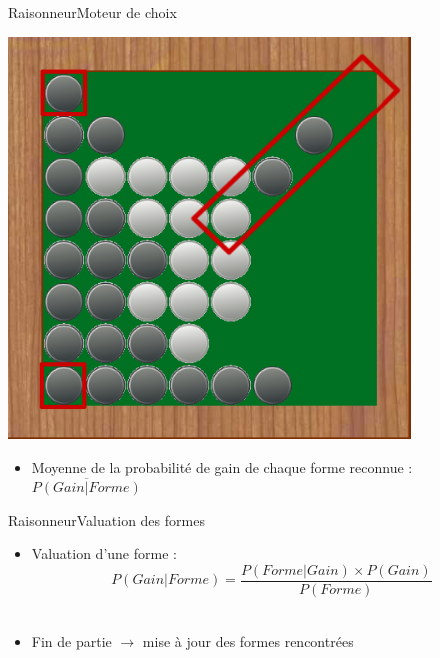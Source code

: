 \begin{frame}{Raisonneur}{Moteur de choix}
	\begin{minipage}{0.45\textwidth}
		\includegraphics[width=0.8\textwidth]{img/screenshoot/raisonneur_choix_2}	
	\end{minipage}
	\begin{minipage}{0.50\textwidth}
		\begin{itemize}
			\item Moyenne de la probabilité de gain de chaque forme reconnue : $\overline{P(Gain|Forme)}$
		\end{itemize}
	\end{minipage}
\end{frame}

\begin{frame}{Raisonneur}{Valuation des formes}
	\begin{itemize}
			\item Valuation d'une forme :
			\[ P(Gain|Forme) = \frac{P(Forme|Gain) \times P(Gain)}{P(Forme)} \]\\[20pt]
			\item Fin de partie $\rightarrow$ mise à jour des formes rencontrées
		\end{itemize}
\end{frame}

